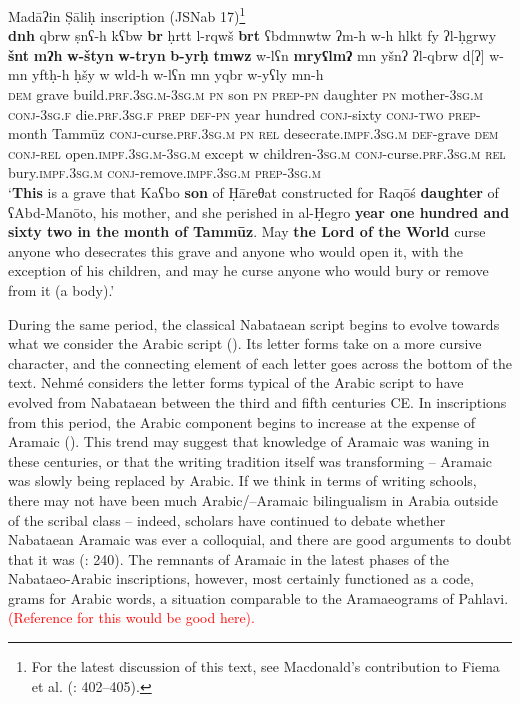\documentclass[output=paper]{langsci/langscibook}
\begin{document}
\ea Madāʔin Ṣāliḥ inscription (JSNab 17)\footnote{For the latest discussion of this text, see Macdonald’s contribution to Fiema et al. (\citeyear{Fiemaetal2015}: 402--405).}\label{Raqosh}\\ 
\gll   \textbf{dnh} qbrw ṣnʕ-h kʕbw \textbf{br} ḥrtt l-rqwš \textbf{brt} ʕbdmnwtw ʔm-h w-h hlkt fy ʔl-ḥgrwy \textbf{šnt} \textbf{mʔh} \textbf{w-štyn} \textbf{w-tryn} \textbf{b-yrḥ} \textbf{tmwz} w-lʕn \textbf{mryʕlmʔ} mn yšnʔ ʔl-qbrw d[ʔ] 	w-mn 		yftḥ-h ḥšy w wld-h w-lʕn mn yqbr w-{y}ʕly mn-h \\
       \textsc{dem} grave build.\textsc{prf.3sg.m-3sg.m} \textsc{pn} son \textsc{pn} \textsc{prep-pn} daughter \textsc{pn} mother-\textsc{3sg.m} \textsc{conj-3sg.f} die.\textsc{prf.3sg.f} \textsc{prep} \textsc{def-pn} year hundred \textsc{conj}-sixty \textsc{conj-two} \textsc{prep}-month Tammūz \textsc{conj}-curse.\textsc{prf.3sg.m} \textsc{pn} \textsc{rel} desecrate.\textsc{impf.3sg.m} \textsc{def}-grave \textsc{dem} \textsc{conj-rel} open.\textsc{impf.3sg.m-3sg.m} except w children-\textsc{3sg.m} \textsc{conj}-curse.\textsc{prf.3sg.m} \textsc{rel} bury.\textsc{impf.3sg.m} \textsc{conj}-remove.\textsc{impf.3sg.m} \textsc{prep-3sg.m} \\
\glt   `\textbf{This} is a grave that Kaʕbo \textbf{son} of Ḥāreθat constructed for Raqōś \textbf{daughter} of ʕAbd-Manōto, his mother, and she perished in al-Ḥegro \textbf{year one hundred and sixty two in the month of Tammūz}. May \textbf{the Lord of the World}  curse anyone who desecrates this grave and anyone who would open it, with the exception of his children, and may he curse anyone who would bury or remove from it (a body).'\\
\z

During the same period, the classical Nabataean script begins to evolve towards what we consider the Arabic script (\citealt{Nehmé2010}). Its letter forms take on a more cursive character, and the connecting element of each letter goes across the bottom of the text. Nehmé considers the letter forms typical of the Arabic script to have evolved from Nabataean between the third and fifth centuries CE. In inscriptions from this period, the Arabic component begins to increase at the expense of Aramaic (\citealt{Nehmé2017}). This trend may suggest that knowledge of Aramaic was waning in these centuries, or that the writing tradition itself was transforming – Aramaic was slowly being replaced by Arabic. If we think in terms of writing schools, there may not have been much Arabic/--Aramaic bilingualism in Arabia outside of the scribal class – indeed, scholars have continued to debate whether Nabataean Aramaic was ever a colloquial, and there are good arguments to doubt that it was (\citealt{Gzella2015}: 240). The remnants of Aramaic in the latest phases of the Nabataeo-Arabic inscriptions, however, most certainly functioned as a code, grams for Arabic words, a situation comparable to the Aramaeograms of Pahlavi. \textcolor{red}{(Reference for this would be good here).}
\end{document}
